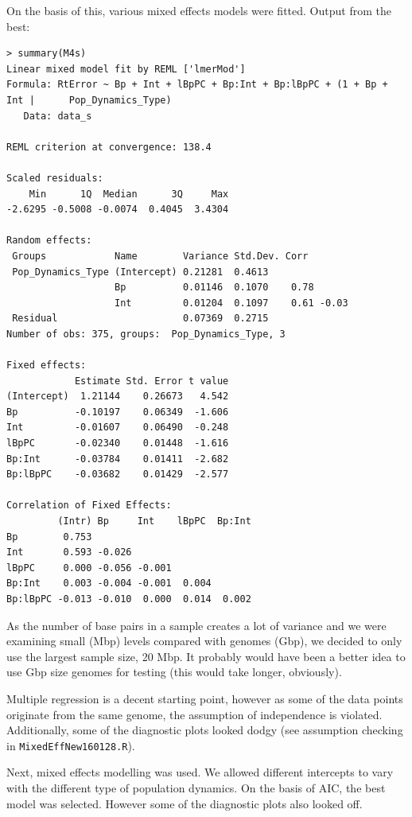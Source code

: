 \documentclass[11pt,a4paper]{article}
\begin{document}
On the basis of this, various mixed effects models were fitted. Output from the best:
\begin{lstlisting}
> summary(M4s)
Linear mixed model fit by REML ['lmerMod']
Formula: RtError ~ Bp + Int + lBpPC + Bp:Int + Bp:lBpPC + (1 + Bp + Int |      Pop_Dynamics_Type)
   Data: data_s

REML criterion at convergence: 138.4

Scaled residuals: 
    Min      1Q  Median      3Q     Max 
-2.6295 -0.5008 -0.0074  0.4045  3.4304 

Random effects:
 Groups            Name        Variance Std.Dev. Corr       
 Pop_Dynamics_Type (Intercept) 0.21281  0.4613              
                   Bp          0.01146  0.1070    0.78      
                   Int         0.01204  0.1097    0.61 -0.03
 Residual                      0.07369  0.2715              
Number of obs: 375, groups:  Pop_Dynamics_Type, 3

Fixed effects:
            Estimate Std. Error t value
(Intercept)  1.21144    0.26673   4.542
Bp          -0.10197    0.06349  -1.606
Int         -0.01607    0.06490  -0.248
lBpPC       -0.02340    0.01448  -1.616
Bp:Int      -0.03784    0.01411  -2.682
Bp:lBpPC    -0.03682    0.01429  -2.577

Correlation of Fixed Effects:
         (Intr) Bp     Int    lBpPC  Bp:Int
Bp        0.753                            
Int       0.593 -0.026                     
lBpPC     0.000 -0.056 -0.001              
Bp:Int    0.003 -0.004 -0.001  0.004       
Bp:lBpPC -0.013 -0.010  0.000  0.014  0.002
\end{lstlisting}

As the number of base pairs in a sample creates a lot of variance and we were examining small (Mbp) levels compared with genomes (Gbp), we decided to only use the largest sample size, 20 Mbp. It probably would have been a better idea to use Gbp size genomes for testing (this would take longer, obviously).

Multiple regression is a decent starting point, however as some of the data points originate from the same genome, the assumption of independence is violated. Additionally, some of the diagnostic plots looked dodgy (see assumption checking in \verb|MixedEffNew160128.R|).

Next, mixed effects modelling was used. We allowed different intercepts to vary with the different type of population dynamics. On the basis of AIC, the best model was selected. However some of the diagnostic plots also looked off.
\end{document}
